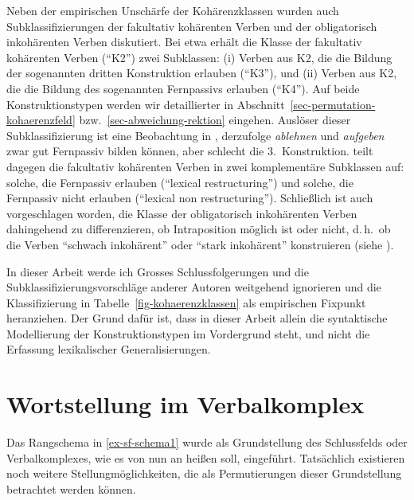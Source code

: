 Neben der empirischen Unschärfe der Kohärenzklassen wurden auch Subklassifizierungen der fakultativ kohärenten Verben und der obligatorisch inkohärenten Verben diskutiert. Bei \cite{Reis:Sternefeld:04} etwa erhält die Klasse der fakultativ kohärenten Verben ("`K2"') zwei Subklassen: (i) Verben aus K2, die die Bildung der sogenannten dritten Konstruktion erlauben ("`K3"'), und (ii) Verben aus K2, die die Bildung des sogenannten Fernpassivs erlauben ("`K4"'). Auf beide Konstruktionstypen werden wir detaillierter in Abschnitt~\ref{sec-permutation-kohaerenzfeld} bzw.\ \ref{sec-abweichung-rektion} eingehen. Auslöser dieser Subklassifizierung ist eine Beobachtung in \citet[318]{Woellstein:01}, derzufolge {\it ablehnen} und {\it aufgeben} zwar gut Fernpassiv bilden können, aber schlecht die 3.~Konstruktion. \cite{Wurmbrand:01} teilt dagegen die fakultativ kohärenten Verben in zwei komplementäre Subklassen auf: solche, die Fernpassiv erlauben ("`lexical restructuring"') und solche, die Fernpassiv nicht erlauben ("`lexical non restructuring"'). Schlie\ss lich ist auch vorgeschlagen worden, die Klasse der obligatorisch inkohärenten Verben dahingehend zu differenzieren, ob Intraposition möglich ist oder nicht, d.\,h.\ ob die Verben "`schwach inkohärent"' oder "`stark inkohärent"' konstruieren (siehe \citealt{Sternefeld:08}). 

In dieser Arbeit werde ich Grosses Schlussfolgerungen und die Subklassifizierungsvorschläge anderer Autoren  weitgehend ignorieren und die Klassifizierung in Tabelle~\ref{fig-kohaerenzklassen} als empirischen Fixpunkt heranziehen. Der Grund dafür ist, dass in dieser Arbeit allein die syntaktische Modellierung der Konstruktionstypen im Vordergrund steht, und nicht die Erfassung lexikalischer Generalisierungen. 




\section{Wortstellung im Verbalkomplex} \label{sec-verbalkomplex}

Das Rangschema in \ref{ex-sf-schema1} wurde als Grundstellung des Schlussfelds oder Verbalkomplexes, wie es von nun an hei\ss en soll, eingeführt. Tatsächlich existieren noch weitere Stellungmöglichkeiten, die als Permutierungen dieser Grundstellung betrachtet werden können. 

